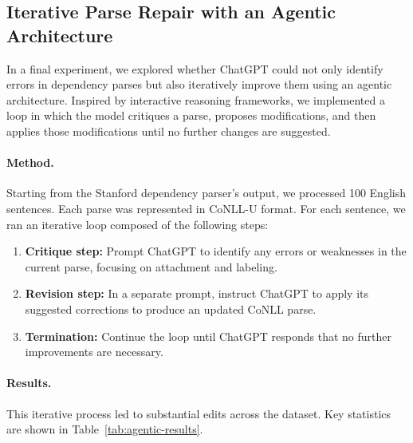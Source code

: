\subsection{Iterative Parse Repair with an Agentic Architecture}
\label{subsec:agentic-parse-repair}

In a final experiment, we explored whether ChatGPT could not only identify errors in dependency parses but also iteratively improve them using an agentic architecture. Inspired by interactive reasoning frameworks, we implemented a loop in which the model critiques a parse, proposes modifications, and then applies those modifications until no further changes are suggested.

\paragraph{Method.}
Starting from the Stanford dependency parser’s output, we processed 100 English sentences. Each parse was represented in CoNLL-U format. For each sentence, we ran an iterative loop composed of the following steps:

\begin{enumerate}
    \item \textbf{Critique step:} Prompt ChatGPT to identify any errors or weaknesses in the current parse, focusing on attachment and labeling.
    \item \textbf{Revision step:} In a separate prompt, instruct ChatGPT to apply its suggested corrections to produce an updated CoNLL parse.
    \item \textbf{Termination:} Continue the loop until ChatGPT responds that no further improvements are necessary.
\end{enumerate}

\paragraph{Results.}
This iterative process led to substantial edits across the dataset. Key statistics are shown in Table~\ref{tab:agentic-results}.

